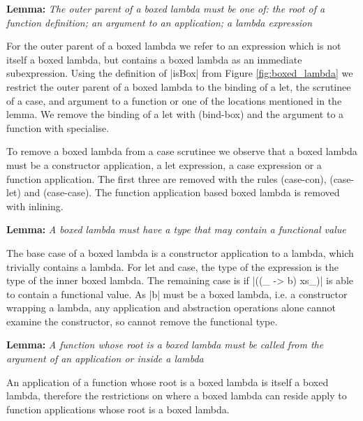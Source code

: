 \documentclass[preprint]{sigplanconf}
\newenvironment{lemma}[1]
    {\smallskip
     \noindent\textbf{Lemma:} \textit{#1}}
    {\noexample}
\begin{document}
\begin{lemma}{The outer parent of a boxed lambda must be one of: the root of a function definition; an argument to an application; a lambda expression}

For the outer parent of a boxed lambda we refer to an expression which is not itself a boxed lambda, but contains a boxed lambda as an immediate subexpression. Using the definition of |isBox| from Figure \ref{fig:boxed_lambda} we restrict the outer parent of a boxed lambda to the binding of a let, the scrutinee of a case, and argument to a function or one of the locations mentioned in the lemma. We remove the binding of a let with (bind-box) and the argument to a function with specialise.

To remove a boxed lambda from a case scrutinee we observe that a boxed lambda must be a constructor application, a let expression, a case expression or a function application. The first three are removed with the rules (case-con), (case-let) and (case-case). The function application based boxed lambda is removed with inlining.
\end{lemma}

\begin{lemma}{A boxed lambda must have a type that may contain a functional value}

The base case of a boxed lambda is a constructor application to a lambda, which trivially contains a lambda. For let and case, the type of the expression is the type of the inner boxed lambda. The remaining case is if |((\vs_ -> b) xs_)| is able to contain a functional value. As |b| must be a boxed lambda, i.e. a constructor wrapping a lambda, any application and abstraction operations alone cannot examine the constructor, so cannot remove the functional type.
\end{lemma}

\begin{lemma}{A function whose root is a boxed lambda must be called from the argument of an application or inside a lambda}

An application of a function whose root is a boxed lambda is itself a boxed lambda, therefore the restrictions on where a boxed lambda can reside apply to function applications whose root is a boxed lambda.
\end{lemma}
\end{document}
